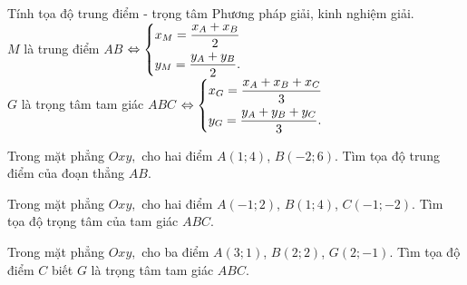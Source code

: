 \begin{dang}%
{Tính tọa độ trung điểm - trọng tâm}
Phương pháp giải, kinh nghiệm giải.\\
$M$ là trung điểm $AB$ $\Leftrightarrow\left\{\begin{aligned}&x_M=\dfrac{x_A+x_B}{2}\\ &y_M=\dfrac{y_A+y_B}{2}.\end{aligned}\right.$\\
$G$ là trọng tâm tam giác $ABC$ $\Leftrightarrow\left\{\begin{aligned}&x_G=\dfrac{x_A+x_B+x_C}{3}\\ &y_G=\dfrac{y_A+y_B+y_C}{3}.\end{aligned}\right.$
\end{dang}
\begin{vd}%
Trong mặt phẳng $Oxy,$ cho hai điểm $A(1;4)$, $B(-2;6)$. Tìm tọa độ trung điểm của đoạn thẳng $AB.$ 
\end{vd}

\begin{vd}%
	Trong mặt phẳng $Oxy,$ cho hai điểm $A(-1;2)$, $B(1;4)$, $C(-1;-2)$. Tìm tọa độ trọng tâm của tam giác $ABC.$
\end{vd}

\begin{vd}%
	Trong mặt phẳng $Oxy,$ cho ba điểm $A(3;1)$, $B(2;2)$, $G(2;-1)$. Tìm tọa độ điểm $C$ biết $G$ là trọng tâm tam giác $ABC$. 
\end{vd}

